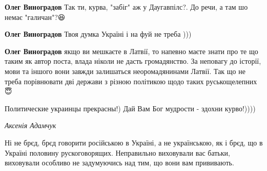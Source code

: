 \begin{itemize}
\begin{itemize}

\textbf{Олег Виноградов} Так ти, курва, "забіг" аж у Даугавпілс?. До речи, а там шо немає "галичан"?😆

\textbf{Олег Виноградов} Твоя думка Україні і на фуй не треба )))

\textbf{Олег Виноградов} якщо ви мешкаєте в Латвії, то напевно маєте знати про
те що таким як автор поста, влада ніколи не дасть громадянство. За неповагу до
історії, мови та іншого вони завжди залишаться неоромадянинами Латвії. Так що
не треба порівнювати дві держави з різною політикою щодо таких руськощелепних😇

Политические украинцы прекрасны!) Дай Вам Бог мудрости - здохни курво!))))
\end{itemize}

\emph{Аксенія Адамчук}

Ні не брєд, брєд говорити російською в Україні, а не українською, як і брєд, що
в Україні половину рускоговорящих. Неправильно виховували вас батьки,
виховували особливо не задумуючись над тим, що вони вам прививають.

\end{itemize}

